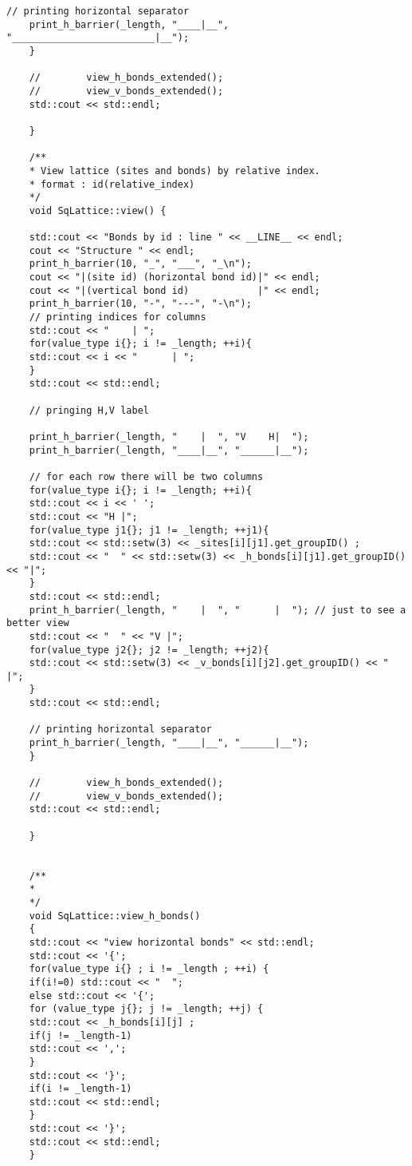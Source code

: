 \begin{lstlisting}[style=CStyle]
	// printing horizontal separator
	print_h_barrier(_length, "____|__", "_________________________|__");
	}
	
	//        view_h_bonds_extended();
	//        view_v_bonds_extended();
	std::cout << std::endl;
	
	}
	
	/**
	* View lattice (sites and bonds) by relative index.
	* format : id(relative_index)
	*/
	void SqLattice::view() {
	
	std::cout << "Bonds by id : line " << __LINE__ << endl;
	cout << "Structure " << endl;
	print_h_barrier(10, "_", "___", "_\n");
	cout << "|(site id) (horizontal bond id)|" << endl;
	cout << "|(vertical bond id)            |" << endl;
	print_h_barrier(10, "-", "---", "-\n");
	// printing indices for columns
	std::cout << "    | ";
	for(value_type i{}; i != _length; ++i){
	std::cout << i << "      | ";
	}
	std::cout << std::endl;
	
	// pringing H,V label
	
	print_h_barrier(_length, "    |  ", "V    H|  ");
	print_h_barrier(_length, "____|__", "______|__");
	
	// for each row there will be two columns
	for(value_type i{}; i != _length; ++i){
	std::cout << i << ' ';
	std::cout << "H |";
	for(value_type j1{}; j1 != _length; ++j1){
	std::cout << std::setw(3) << _sites[i][j1].get_groupID() ;
	std::cout << "  " << std::setw(3) << _h_bonds[i][j1].get_groupID() << "|";
	}
	std::cout << std::endl;
	print_h_barrier(_length, "    |  ", "      |  "); // just to see a better view
	std::cout << "  " << "V |";
	for(value_type j2{}; j2 != _length; ++j2){
	std::cout << std::setw(3) << _v_bonds[i][j2].get_groupID() << "     |";
	}
	std::cout << std::endl;
	
	// printing horizontal separator
	print_h_barrier(_length, "____|__", "______|__");
	}
	
	//        view_h_bonds_extended();
	//        view_v_bonds_extended();
	std::cout << std::endl;
	
	}
	
	
	/**
	*
	*/
	void SqLattice::view_h_bonds()
	{
	std::cout << "view horizontal bonds" << std::endl;
	std::cout << '{';
	for(value_type i{} ; i != _length ; ++i) {
	if(i!=0) std::cout << "  ";
	else std::cout << '{';
	for (value_type j{}; j != _length; ++j) {
	std::cout << _h_bonds[i][j] ;
	if(j != _length-1)
	std::cout << ',';
	}
	std::cout << '}';
	if(i != _length-1)
	std::cout << std::endl;
	}
	std::cout << '}';
	std::cout << std::endl;
	}
	

\end{lstlisting}
